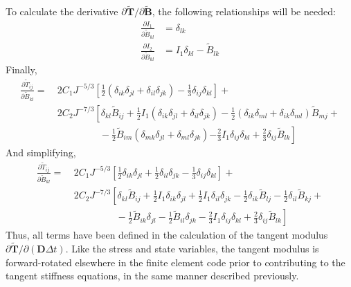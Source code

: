 To calculate the derivative $\partial \tilde{\bm T}/\partial {\tilde{\bm {B}}}$, the following relationships will be needed:
\begin{align}
\frac{\partial I_1}{\partial \tilde{B}_{kl}} &= \delta_{lk}  \\
\frac{\partial I_2}{\partial \tilde{B}_{kl}} &= I_1\delta_{kl} - \tilde{B}_{lk}
\end{align}
Finally,
\begin{equation}
\begin{aligned}
\frac{\partial \tilde{T}_{ij}}{\partial \tilde{B}_{kl}} = &\ 2C_1J^{-5/3}\left[\frac{1}{2}\left(\delta_{ik}\delta_{jl} + \delta_{il}\delta_{jk}\right) - \frac{1}{3}\delta_{ij}\delta_{kl}\right] + \\
&\ 2C_2J^{-7/3}\left[\delta_{kl}\tilde{B}_{ij} + \frac{1}{2}I_1\left(\delta_{ik}\delta_{jl} + \delta_{il}\delta_{jk}\right) -\frac{1}{2}\left(\delta_{ik}\delta_{ml} + \delta_{ik}\delta_{ml}\right)\tilde{B}_{mj} \right. + \\
&\phantom{xxxxxxxx}-\frac{1}{2}\tilde{B}_{im}\left(\delta_{mk}\delta_{jl} +\delta_{ml}\delta_{jk}\right) 
\left.- \frac{2}{3}I_1\delta_{ij}\delta_{kl} + \frac{2}{3}\delta_{ij}\tilde{B}_{lk}\right]
\end{aligned}
\end{equation}
And simplifying,
\begin{equation}
\begin{aligned}
\frac{\partial \tilde{T}_{ij}}{\partial \tilde{B}_{kl}} = &\ 2C_1J^{-5/3}\left[\frac{1}{2}\delta_{ik}\delta_{jl} + \frac{1}{2}\delta_{il}\delta_{jk} - \frac{1}{3}\delta_{ij}\delta_{kl}\right] + \\
&\ 2C_2J^{-7/3}\left[\delta_{kl}\tilde{B}_{ij} + \frac{1}{2}I_1\delta_{ik}\delta_{jl} + \frac{1}{2}I_1\delta_{il}\delta_{jk} -\frac{1}{2}\delta_{ik}\tilde{B}_{lj} -\frac{1}{2}\delta_{il}\tilde{B}_{kj} \right. + \\
&\left.\phantom{xxxxxxxx}-\frac{1}{2}\tilde{B}_{ik}\delta_{jl} -\frac{1}{2}\tilde{B}_{il}\delta_{jk} - \frac{2}{3}I_1\delta_{ij}\delta_{kl} + \frac{2}{3}\delta_{ij}\tilde{B}_{lk}\right]
\end{aligned}
\end{equation}
Thus, all terms have been defined in the calculation of the tangent modulus $\partial{\tilde{\bm{T}}}/\partial({\bm{D}\Delta{t}})$. Like the stress and state variables, the tangent modulus is forward-rotated elsewhere in the finite element code prior to contributing to the tangent stiffness equations, in the same manner described previously.

